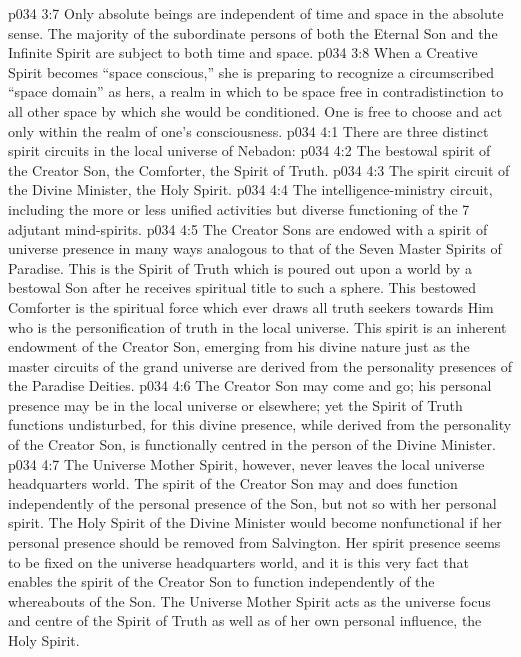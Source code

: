 \vs p034 3:7 \pc Only absolute beings are independent of time and space in the absolute sense. The majority of the subordinate persons of both the Eternal Son and the Infinite Spirit are subject to both time and space.
\vs p034 3:8 When a Creative Spirit becomes “space conscious,” she is preparing to recognize a circumscribed “space domain” as hers, a realm in which to be space free in contradistinction to all other space by which she would be conditioned. One is free to choose and act only within the realm of one’s consciousness.
\vs p034 4:1 There are three distinct spirit circuits in the local universe of Nebadon:
\vs p034 4:2 \bibnobreakspace The bestowal spirit of the Creator Son, the Comforter, the Spirit of Truth.
\vs p034 4:3 \bibnobreakspace The spirit circuit of the Divine Minister, the Holy Spirit.
\vs p034 4:4 \bibnobreakspace The intelligence\hyp{}ministry circuit, including the more or less unified activities but diverse functioning of the 7 adjutant mind\hyp{}spirits.
\vs p034 4:5 \pc The Creator Sons are endowed with a spirit of universe presence in many ways analogous to that of the Seven Master Spirits of Paradise. This is the Spirit of Truth which is poured out upon a world by a bestowal Son after he receives spiritual title to such a sphere. This bestowed Comforter is the spiritual force which ever draws all truth seekers towards Him who is the personification of truth in the local universe. This spirit is an inherent endowment of the Creator Son, emerging from his divine nature just as the master circuits of the grand universe are derived from the personality presences of the Paradise Deities.
\vs p034 4:6 The Creator Son may come and go; his personal presence may be in the local universe or elsewhere; yet the Spirit of Truth functions undisturbed, for this divine presence, while derived from the personality of the Creator Son, is functionally centred in the person of the Divine Minister.
\vs p034 4:7 The Universe Mother Spirit, however, never leaves the local universe headquarters world. The spirit of the Creator Son may and does function independently of the personal presence of the Son, but not so with her personal spirit. The Holy Spirit of the Divine Minister would become nonfunctional if her personal presence should be removed from Salvington. Her spirit presence seems to be fixed on the universe headquarters world, and it is this very fact that enables the spirit of the Creator Son to function independently of the whereabouts of the Son. The Universe Mother Spirit acts as the universe focus and centre of the Spirit of Truth as well as of her own personal influence, the Holy Spirit.
